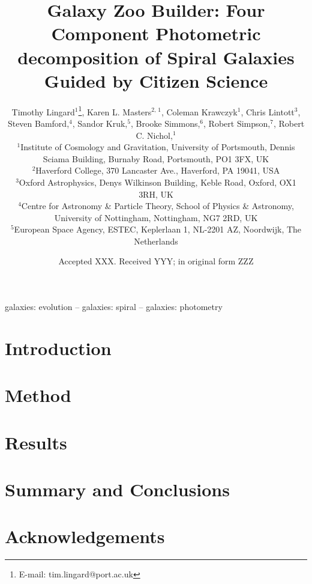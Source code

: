 \documentclass[fleqn,usenatbib]{mnras}
\title[Galaxy Zoo Builder: Method paper]{Galaxy Zoo Builder: Four Component Photometric decomposition of Spiral Galaxies Guided by Citizen Science}
\author[T. Lingard et al.]{
  Timothy Lingard$^{1}$\thanks{E-mail: tim.lingard@port.ac.uk},
  Karen L. Masters$^{2,\,1}$,
  Coleman Krawczyk$^{1}$,
  Chris Lintott$^{3}$,
  \newauthor
  Steven Bamford,$^{4}$,
  Sandor Kruk,$^{5}$,
  Brooke Simmons,$^{6}$,
  Robert Simpson,$^{7}$,
  \newauthor
  Robert C. Nichol,$^{1}$
  \\
  $^{1}$Institute of Cosmology and Gravitation, University of Portsmouth, Dennis Sciama Building, Burnaby Road, Portsmouth, PO1 3FX, UK\\
  $^{2}$Haverford College, 370 Lancaster Ave., Haverford, PA 19041, USA\\
  $^{3}$Oxford Astrophysics, Denys Wilkinson Building, Keble Road, Oxford, OX1 3RH, UK\\
  $^{4}$Centre for Astronomy \& Particle Theory, School of Physics \& Astronomy, University of Nottingham, Nottingham, NG7 2RD, UK\\
  $^{5}$European Space Agency, ESTEC, Keplerlaan 1, NL-2201 AZ, Noordwijk, The Netherlands
}
\date{Accepted XXX. Received YYY; in original form ZZZ}
\begin{document}
\label{firstpage}
\pagerange{\pageref{firstpage}--\pageref{lastpage}}
\maketitle

\begin{abstract}

\end{abstract}

\begin{keywords}
galaxies: evolution -- galaxies: spiral -- galaxies: photometry
\end{keywords}



\section{Introduction}


\section{Method}


\section{Results}


\section{Summary and Conclusions}


\section{Acknowledgements}










\appendix





\bsp	%
\label{lastpage}
\end{document}
